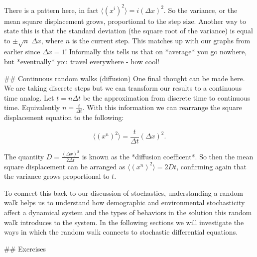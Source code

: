 \documentclass[
]{book}
\theoremstyle{definition}
\theoremstyle{definition}
\theoremstyle{definition}
\theoremstyle{remark}
\begin{document}
There is a pattern here, in fact $\langle (x^{i})^{2} \rangle = i ( \Delta x)^{2}$.  So the variance, or the mean square displacement grows, proportional to the step size.  Another way to state this is that the standard deviation (the square root of the variance) is equal to $\pm \sqrt{n} \; \Delta x$, where $n$ is the current step. This matches up with our graphs from earlier since $\Delta x =1$!  Informally this tells us that on *average* you go nowhere, but *eventually* you travel everywhere - how cool!

## Continuous random walks (diffusion)
One final thought can be made here.  We are taking discrete steps but we can transform our results to a continuous time analog.  Let $t= n \Delta t$ be the approximation from discrete time to continuous time. Equivalently $\displaystyle n = \frac{t}{\Delta t}$.  With this information we can rearrange the square displacement equation to the following:

\begin{equation}
\big \langle (x^{n})^{2} \big \rangle = \frac{t}{\Delta t} ( \Delta x)^{2}.
\end{equation}

The quantity $\displaystyle D = \frac{( \Delta x)^{2}}{2 \Delta t}$ is known as the *diffusion coefficent*.  So then the mean square displacement can be arranged as $\langle (x^{n})^{2} \rangle  = 2Dt$, confirming again that the variance grows proportional to $t$.

To connect this back to our discussion of stochastics, understanding a random walk helps us to understand how demographic and environmental stochasticity affect a dynamical system and the types of behaviors in the solution this random walk introduces to the system.  In the following sections we will investigate the ways in which the random walk connects to stochastic differential equations.

\newpage

## Exercises
\end{document}
